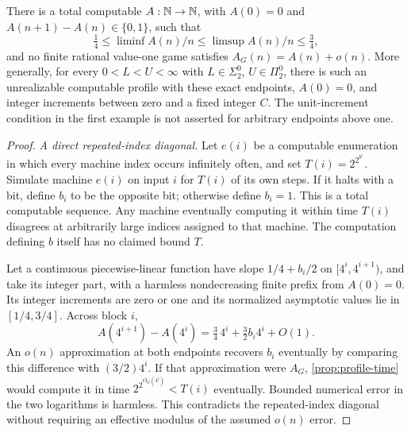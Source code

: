 \begin{theorem}\label{thm:profile-nonrealizable}
There is a total computable $A:\mathbb N\to\mathbb N$, with $A(0)=0$ and $A(n+1)-A(n)\in\{0,1\}$, such that
\[
 \tfrac14\le\liminf A(n)/n\le\limsup A(n)/n\le\tfrac34,
\]
and no finite rational value-one game satisfies $A_G(n)=A(n)+o(n)$. More generally, for every $0<L<U<\infty$ with $L\in\Sigma^0_2$, $U\in\Pi^0_2$, there is such an unrealizable computable profile with these exact endpoints, $A(0)=0$, and integer increments between zero and a fixed integer $C$. The unit-increment condition in the first example is not asserted for arbitrary endpoints above one.
\end{theorem}
\begin{proof}
\par\smallskip\noindent\textit{A direct repeated-index diagonal.}\quad
Let $e(i)$ be a computable enumeration in which every machine index occurs infinitely often, and set $T(i)=2^{2^{8^i}}$. Simulate machine $e(i)$ on input $i$ for $T(i)$ of its own steps. If it halts with a bit, define $b_i$ to be the opposite bit; otherwise define $b_i=1$. This is a total computable sequence. Any machine eventually computing it within time $T(i)$ disagrees at arbitrarily large indices assigned to that machine. The computation defining $b$ itself has no claimed bound $T$.

Let a continuous piecewise-linear function have slope $1/4+b_i/2$ on $[4^i,4^{i+1})$, and take its integer part, with a harmless nondecreasing finite prefix from $A(0)=0$. Its integer increments are zero or one and its normalized asymptotic values lie in $[1/4,3/4]$. Across block $i$,
\[
 A(4^{i+1})-A(4^i)=\tfrac34\,4^i+\tfrac32b_i4^i+O(1).
\]
An $o(n)$ approximation at both endpoints recovers $b_i$ eventually by comparing this difference with $(3/2)4^i$. If that approximation were $A_G$, \cref{prop:profile-time} would compute it in time $2^{2^{O_G(4^i)}}<T(i)$ eventually. Bounded numerical error in the two logarithms is harmless. This contradicts the repeated-index diagonal without requiring an effective modulus of the assumed $o(n)$ error.


\end{proof}
